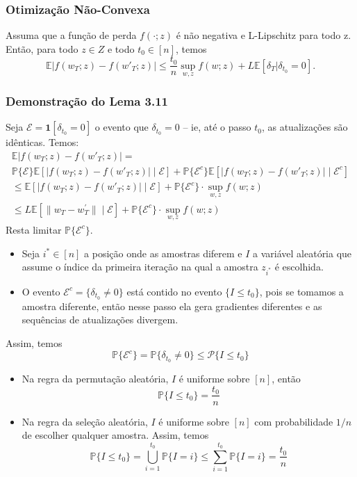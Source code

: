 \documentclass{beamer}
\newcommand{\EE}{\mathbb{E}}
\begin{document}
\begin{frame}
\frametitle{Otimização Não-Convexa}
\begin{lemma}[3.11]
Assuma que a função de perda \(f( \cdot ;z)\) é não negativa e L-Lipschitz para todo z.  Então, para todo \(z \in Z\) e todo \(t_0 \in [n]\), temos
$$ \EE|f(w_T;z) - f(w'_T;z)| \le \frac{t_0}{n}\sup_{w,z}f(w;z) + L\EE[\delta_T|\delta_{t_0}=0]. $$ 
\end{lemma}
\end{frame}

\begin{frame}
\frametitle{Demonstração do Lema 3.11} 
Seja \(\mathcal{E} = \mathbf{1}[\delta_{t_0}=0]\) o evento que \(\delta_{t_0}=0\) -- ie, até o passo $t_0$, as atualizações são idênticas. Temos:
{\small
\begin{multline*}
\EE|f(w_T;z) - f(w'_T;z)| =\\
 \mathbb{P}\{\mathcal{E}\}\EE[|f(w_T;z) - f(w'_T;z)|\mid\mathcal{E}] + \mathbb{P}\{\mathcal{E}^c\}\EE[|f(w_T;z) - f(w'_T;z)|\mid\mathcal{E}^c] \\
\le \EE[|f(w_T;z) - f(w'_T;z)|\mid\mathcal{E}] + \mathbb{P}\{\mathcal{E}^c\} \cdot \sup_{w,z}f(w;z) \\
\le L\EE[\|w_T- w_T^\prime\| \mid \mathcal{E}] + \mathbb{P}\{\mathcal{E}^c\} \cdot \sup_{w,z}f(w;z) 
\end{multline*} }
Resta limitar \(\mathbb{P}\{\mathcal{E}^c\}\). 
\end{frame}

\begin{frame}
    \begin{itemize}
        \item Seja $i^*\in[n]$ a posição onde as amostras diferem e $I$ a variável aleatória que assume o índice da primeira iteração na qual a amostra $z_{i^*}$ é escolhida. 
        \item O evento \(\mathcal{E}^c = \{\delta_{t_0}\neq 0\}\)  está contido no evento \(\{I \le t_0\}\), pois se tomamos a amostra diferente, então nesse passo ela gera gradientes diferentes e as sequências de atualizações divergem.
    \end{itemize}
    Assim, temos
$$ \mathbb{P}\{\mathcal{E}^c\} = \mathbb{P}\{\delta_{t_0}\neq 0\} \le \mathcal{P}\{I \le t_0\} $$ 
\end{frame}

\begin{frame}
    \begin{itemize}
        \item Na regra da permutação aleatória, $I$ é uniforme sobre $[n]$, então
$$ \mathbb{P}\{I \le t_0\} = \frac{t_0}{n} $$ 
        \item Na regra da seleção aleatória, $I$ é uniforme sobre \([n]\) com probabilidade \(1/n\) de escolher qualquer amostra. Assim, temos
        $$\mathbb{P}\{I \le t_0\} = \bigcup_{i=1}^{t_0} \mathbb{P}\{I = i\} \le \sum_{i=1}^{t_0} \mathbb{P}\{I = i\} = \frac{t_0}{n} $$
    \end{itemize}
\end{frame}
\end{document}

